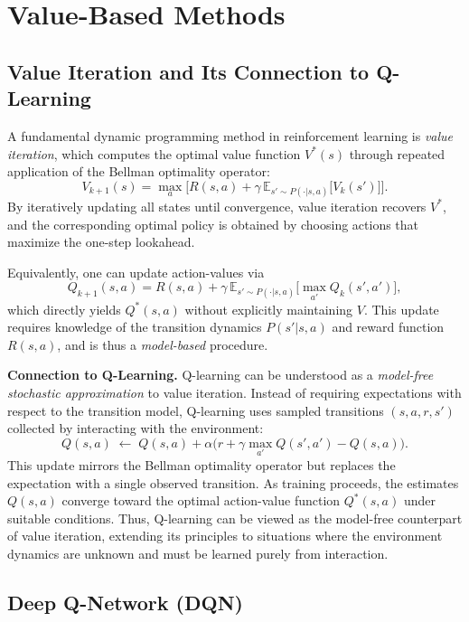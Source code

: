 \chapter{Value-Based Methods}

\section*{Value Iteration and Its Connection to Q-Learning}

A fundamental dynamic programming method in reinforcement learning is
\emph{value iteration}, which computes the optimal value function $V^*(s)$
through repeated application of the Bellman optimality operator:
\[
V_{k+1}(s) = \max_a \Big[ R(s,a) + \gamma \, \mathbb{E}_{s'\sim P(\cdot|s,a)} 
               \big[ V_k(s') \big] \Big].
\]
By iteratively updating all states until convergence, value iteration recovers
$V^*$, and the corresponding optimal policy is obtained by choosing actions
that maximize the one-step lookahead.

Equivalently, one can update action-values via
\[
Q_{k+1}(s,a) = R(s,a) + \gamma \, \mathbb{E}_{s'\sim P(\cdot|s,a)} 
               \big[ \max_{a'} Q_k(s',a') \big],
\]
which directly yields $Q^*(s,a)$ without explicitly maintaining $V$.
This update requires knowledge of the transition dynamics $P(s'|s,a)$ and
reward function $R(s,a)$, and is thus a \emph{model-based} procedure.

\medskip
\noindent
\textbf{Connection to Q-Learning.}  
Q-learning can be understood as a \emph{model-free stochastic approximation} to
value iteration. Instead of requiring expectations with respect to the
transition model, Q-learning uses sampled transitions $(s,a,r,s')$ collected by
interacting with the environment:
\[
Q(s,a) \;\leftarrow\; Q(s,a) + \alpha \Big( r + \gamma \max_{a'} Q(s',a') - Q(s,a) \Big).
\]
This update mirrors the Bellman optimality operator but replaces the
expectation with a single observed transition. As training proceeds, the
estimates $Q(s,a)$ converge toward the optimal action-value function $Q^*(s,a)$
under suitable conditions. Thus, Q-learning can be viewed as the
model-free counterpart of value iteration, extending its principles to
situations where the environment dynamics are unknown and must be learned
purely from interaction.


\section{Deep Q-Network (DQN)}

